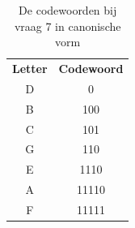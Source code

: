 \documentclass[]{article}
\begin{document}
\begin{section}
\begin{subsection}
        \begin{table}
            \centering
            \begin{tabular}{c|c}
            \textbf{Letter} &
            \textbf{Codewoord} \\
            D & 0 \\
            B & 100 \\
            C & 101 \\
            G & 110 \\
            E & 1110 \\
            A & 11110 \\
            F & 11111 \\
            \end{tabular}
            \caption{De codewoorden bij vraag 7 in canonische vorm}
            \label{tab:canonical_codes}
        \end{table}

    \end{subsection}

\end{section}
\end{document}
